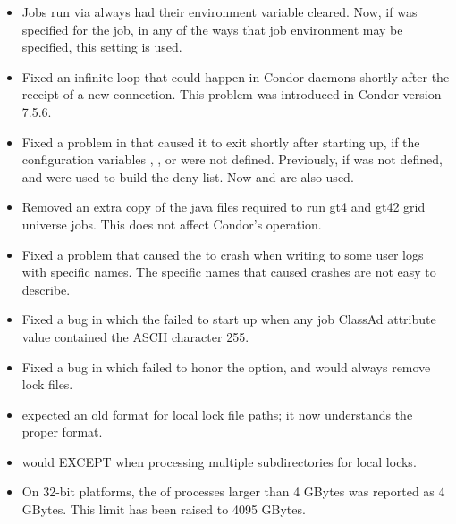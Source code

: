 \begin{itemize}
\item Jobs run via  always had their  environment
variable cleared.  Now, if  was specified for the job, 
in any of the ways that job environment may be specified, 
this setting is used.

\item Fixed an infinite loop that could happen in Condor daemons
shortly after the receipt of a new connection.  
This problem was introduced in Condor version 7.5.6.

\item Fixed a problem in  that caused it to exit shortly
after starting up,
if the configuration variables 
, , or  
were not defined.
Previously, if  was
not defined,  and 
were used to build the deny list.  
Now  and  are also used.

\item Removed an extra copy of the java files required to run gt4 and gt42
grid universe jobs. This does not affect Condor's operation.

\item Fixed a problem that caused the  to crash when
writing to some user logs with specific names.  The specific names that
caused crashes are not easy to describe.

\item Fixed a bug in which the  failed to start up
when any job ClassAd attribute value contained the ASCII character 255.

\item Fixed a bug in which  failed to honor the 
 option, and would always remove lock files.

\item {} expected an old format for local lock file paths;
it now understands the proper format.

\item {} would EXCEPT when processing multiple 
subdirectories for local locks.

\item On 32-bit platforms, the  of processes larger than 
4 GBytes was reported as 4 GBytes.  This limit has been raised to 4095 GBytes.


\end{itemize}
